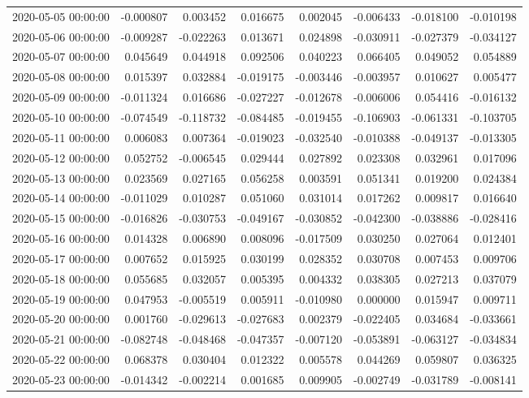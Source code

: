 \begin{tabular}{lrrrrrrr}
2020-05-05 00:00:00 & -0.000807 & 0.003452 & 0.016675 & 0.002045 & -0.006433 & -0.018100 & -0.010198 \\
2020-05-06 00:00:00 & -0.009287 & -0.022263 & 0.013671 & 0.024898 & -0.030911 & -0.027379 & -0.034127 \\
2020-05-07 00:00:00 & 0.045649 & 0.044918 & 0.092506 & 0.040223 & 0.066405 & 0.049052 & 0.054889 \\
2020-05-08 00:00:00 & 0.015397 & 0.032884 & -0.019175 & -0.003446 & -0.003957 & 0.010627 & 0.005477 \\
2020-05-09 00:00:00 & -0.011324 & 0.016686 & -0.027227 & -0.012678 & -0.006006 & 0.054416 & -0.016132 \\
2020-05-10 00:00:00 & -0.074549 & -0.118732 & -0.084485 & -0.019455 & -0.106903 & -0.061331 & -0.103705 \\
2020-05-11 00:00:00 & 0.006083 & 0.007364 & -0.019023 & -0.032540 & -0.010388 & -0.049137 & -0.013305 \\
2020-05-12 00:00:00 & 0.052752 & -0.006545 & 0.029444 & 0.027892 & 0.023308 & 0.032961 & 0.017096 \\
2020-05-13 00:00:00 & 0.023569 & 0.027165 & 0.056258 & 0.003591 & 0.051341 & 0.019200 & 0.024384 \\
2020-05-14 00:00:00 & -0.011029 & 0.010287 & 0.051060 & 0.031014 & 0.017262 & 0.009817 & 0.016640 \\
2020-05-15 00:00:00 & -0.016826 & -0.030753 & -0.049167 & -0.030852 & -0.042300 & -0.038886 & -0.028416 \\
2020-05-16 00:00:00 & 0.014328 & 0.006890 & 0.008096 & -0.017509 & 0.030250 & 0.027064 & 0.012401 \\
2020-05-17 00:00:00 & 0.007652 & 0.015925 & 0.030199 & 0.028352 & 0.030708 & 0.007453 & 0.009706 \\
2020-05-18 00:00:00 & 0.055685 & 0.032057 & 0.005395 & 0.004332 & 0.038305 & 0.027213 & 0.037079 \\
2020-05-19 00:00:00 & 0.047953 & -0.005519 & 0.005911 & -0.010980 & 0.000000 & 0.015947 & 0.009711 \\
2020-05-20 00:00:00 & 0.001760 & -0.029613 & -0.027683 & 0.002379 & -0.022405 & 0.034684 & -0.033661 \\
2020-05-21 00:00:00 & -0.082748 & -0.048468 & -0.047357 & -0.007120 & -0.053891 & -0.063127 & -0.034834 \\
2020-05-22 00:00:00 & 0.068378 & 0.030404 & 0.012322 & 0.005578 & 0.044269 & 0.059807 & 0.036325 \\
2020-05-23 00:00:00 & -0.014342 & -0.002214 & 0.001685 & 0.009905 & -0.002749 & -0.031789 & -0.008141 \\

\end{tabular}
